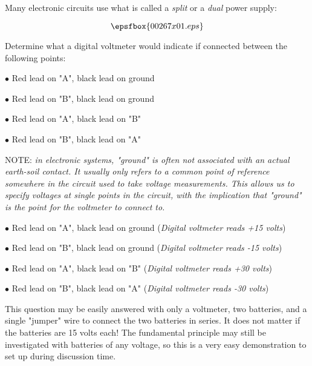 

Many electronic circuits use what is called a {\it split} or a {\it dual} power supply:

$$\epsfbox{00267x01.eps}$$

Determine what a digital voltmeter would indicate if connected between the following points:

\medskip
\item{$\bullet$} Red lead on "A", black lead on ground
\item{$\bullet$} Red lead on "B", black lead on ground
\item{$\bullet$} Red lead on "A", black lead on "B"
\item{$\bullet$} Red lead on "B", black lead on "A"
\medskip

NOTE: {\it in electronic systems, "ground" is often not associated with an actual earth-soil contact.  It usually only refers to a common point of reference somewhere in the circuit used to take voltage measurements.  This allows us to specify voltages at single points in the circuit, with the implication that "ground" is the  point for the voltmeter to connect to.}

\vskip 10pt







\medskip
\item{$\bullet$} Red lead on "A", black lead on ground ({\it Digital voltmeter reads +15 volts})
\item{$\bullet$} Red lead on "B", black lead on ground ({\it Digital voltmeter reads -15 volts})
\item{$\bullet$} Red lead on "A", black lead on "B" ({\it Digital voltmeter reads +30 volts})
\item{$\bullet$} Red lead on "B", black lead on "A" ({\it Digital voltmeter reads -30 volts})
\medskip







This question may be easily answered with only a voltmeter, two batteries, and a single "jumper" wire to connect the two batteries in series.  It does not matter if the batteries are 15 volts each!  The fundamental principle may still be investigated with batteries of any voltage, so this is a very easy demonstration to set up during discussion time.




